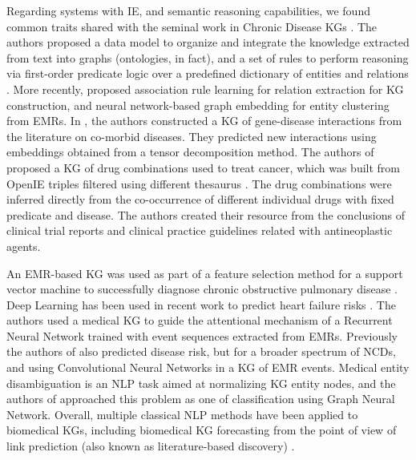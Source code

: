 \documentclass[preprint]{elsarticle}
\begin{document}
Regarding systems with IE, and semantic reasoning capabilities, we found common traits shared with the seminal work in Chronic Disease KGs \cite{shi2017semantic}. The authors proposed a data model to organize and integrate the knowledge extracted from text into graphs (ontologies, in fact), and a set of rules to perform reasoning via first-order predicate logic over a predefined dictionary of entities and relations \cite{bizon2019robokop}. More recently, \cite{li2020real} proposed association rule learning for relation extraction for KG construction, and neural network-based graph embedding for entity clustering from EMRs. In \cite{8758152}, the authors constructed a KG of gene-disease interactions from the literature on co-morbid diseases. They predicted new interactions using embeddings obtained from a tensor decomposition method. The authors of \cite{du2020knowledge} proposed a KG of drug combinations used to treat cancer, which was built from OpenIE triples filtered using different thesaurus \cite{RINDFLESCH2003462,Wei2013PubTatorAW}. The drug combinations were inferred directly from the co-occurrence of different individual drugs with fixed predicate and disease. The authors created their resource from the conclusions of clinical trial reports and clinical practice guidelines related with antineoplastic agents.

An EMR-based KG was used as part of a feature selection method for a support vector machine to successfully diagnose chronic obstructive pulmonary disease \cite{8682042}. Deep Learning has been used in recent work to predict heart failure risks \cite{info:doi/10.2196/20645}. The authors used a medical KG to guide the attentional mechanism of a Recurrent Neural Network trained with event sequences extracted from EMRs. Previously the authors of \cite{zhang2017hcnn} also predicted disease risk, but for a broader spectrum of NCDs, and using Convolutional Neural Networks in a KG of EMR events. Medical entity disambiguation is an NLP task aimed at normalizing KG entity nodes, and the authors of \cite{10.1145/3448016.3457328} approached this problem as one of classification using Graph Neural Network. Overall, multiple classical NLP methods have been applied to biomedical KGs, including biomedical KG forecasting from the point of view of link prediction (also known as literature-based discovery) \cite{crichton2019improving}.
\end{document}

